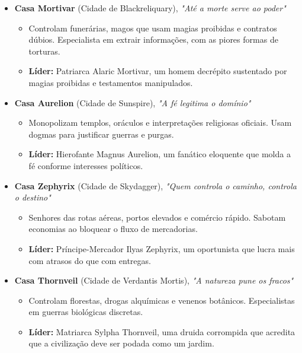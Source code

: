 \begin{itemize}
    \item \textbf{\ringmfamily Casa Mortivar} (Cidade de Blackreliquary), \textit{"Até a morte serve ao poder"}
    \begin{itemize}
        \item Controlam funerárias, magos que usam magias proibidas e contratos dúbios. Especialista em extrair informações, com as piores formas de torturas.
        \item \textbf{\ringmfamily Líder:} Patriarca Alaric Mortivar, um homem decrépito sustentado por magias proibidas e testamentos manipulados.
    \end{itemize}
    
    \item \textbf{\ringmfamily Casa Aurelion} (Cidade de Sunspire), \textit{"A fé legitima o domínio"}
    \begin{itemize}
        \item Monopolizam templos, oráculos e interpretações religiosas oficiais. Usam dogmas para justificar guerras e purgas.
        \item \textbf{\ringmfamily Líder:} Hierofante Magnus Aurelion, um fanático eloquente que molda a fé conforme interesses políticos.
    \end{itemize}
    
    \item \textbf{\ringmfamily Casa Zephyrix} (Cidade de Skydagger), \textit{"Quem controla o caminho, controla o destino"}
    \begin{itemize}
        \item Senhores das rotas aéreas, portos elevados e comércio rápido. Sabotam economias ao bloquear o fluxo de mercadorias.
        \item \textbf{\ringmfamily Líder:} Príncipe-Mercador Ilyas Zephyrix, um oportunista que lucra mais com atrasos do que com entregas.
    \end{itemize}
    
    \item \textbf{\ringmfamily Casa Thornveil} (Cidade de Verdantis Mortis), \textit{"A natureza pune os fracos"}
    \begin{itemize}
        \item Controlam florestas, drogas alquímicas e venenos botânicos. Especialistas em guerras biológicas discretas.
        \item \textbf{\ringmfamily Líder:} Matriarca Sylpha Thornveil, uma druida corrompida que acredita que a civilização deve ser podada como um jardim.
    \end{itemize}

\end{itemize}

